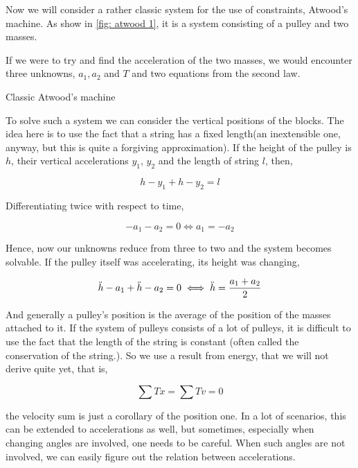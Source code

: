 Now we will consider a rather classic system for the use of constraints,
Atwood's machine. As show in \cref{fig: atwood 1}, it is a system consisting of a pulley 
and two masses. 

If we were to try and find the acceleration of the two masses, we would encounter 
three unknowns, \(a_1, a_2\) and \(T\) and two equations from the second law.

\begin{marginfigure}
    \caption{Classic Atwood's machine}
    \label{fig: atwood 1}
\end{marginfigure}

To solve such a system we can consider the vertical positions of the blocks. The idea 
here is to use the fact that a string has a fixed length(an inextensible one, anyway, but 
this is quite a forgiving approximation). If the height of the pulley is \(h\), 
their vertical accelerations \(y_1\), \(y_2\) and the length of string \(l\), then,

\begin{equation*}
    h - y_1 + h - y_2 = l
\end{equation*}

Differentiating twice with respect to time, 

\begin{equation*}
    - a_1 - a_2 = 0 \iff a_1 = -a_2
\end{equation*}

Hence, now our unknowns reduce from three to two and the system becomes solvable.
If the pulley itself was accelerating, its height was changing,

\begin{equation*}
    \ddot{h} - a_1 + \ddot{h} - a_2 = 0 \iff \ddot{h} = \frac{a_1 + a_2}{2}
\end{equation*}

And generally a pulley's position is the average of the position of the masses attached to it.
If the system of pulleys consists of a lot of pulleys, it is difficult to use 
the fact that the length of the string is constant (often called the conservation of 
the string.). So we use a result from energy, that we will not derive quite yet, that is,

\begin{equation*}
    \sum Tx = \sum Tv = 0
\end{equation*}

the velocity sum is just a corollary of the position one. In a lot of scenarios, 
this can be extended to accelerations as well, but sometimes, especially when 
changing angles are involved, one needs to be careful. When such angles are not 
involved, we can easily figure out the relation between accelerations. 

